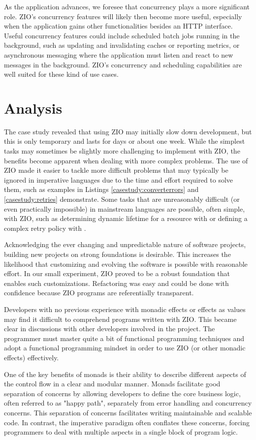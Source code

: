 As the application advances, we foresee that concurrency plays a more significant role. ZIO's concurrency features will likely then become more useful, especially when the application gains other functionalities besides an HTTP interface. Useful concurrency features could include scheduled batch jobs running in the background, such as updating and invalidating caches or reporting metrics, or asynchronous messaging where the application must listen and react to new messages in the background. ZIO's concurrency and scheduling capabilities are well suited for these kind of use cases.


\section{Analysis}
The case study revealed that using ZIO may initially slow down development, but this is only temporary and lasts for days or about one week. While the simplest tasks may sometimes be slightly more challenging to implement with ZIO, the benefits become apparent when dealing with more complex problems. The use of ZIO made it easier to tackle more difficult problems that may typically be ignored in imperative languages due to the time and effort required to solve them, such as examples in Listings \ref{casestudy:converterrors} and \ref{casestudy:retries} demonstrate. Some tasks that are unreasonably difficult (or even practically impossible) in mainstream languages are possible, often simple, with ZIO, such as determining dynamic lifetime for a resource with  or defining a complex retry policy with .

Acknowledging the ever changing and unpredictable nature of software projects, building new projects on strong foundations is desirable. This increases the likelihood that customizing and evolving the software is possible with reasonable effort. In our small experiment, ZIO proved to be a robust foundation that enables such customizations. Refactoring was easy and could be done with confidence because ZIO programs are referentially transparent.

Developers with no previous experience with monadic effects or effects as values may find it difficult to comprehend programs written with ZIO. This became clear in discussions with other developers involved in the project. The programmer must master quite a bit of functional programming techniques and adopt a functional programming mindset in order to use ZIO (or other monadic effects) effectively.

One of the key benefits of monads is their ability to describe different aspects of the control flow in a clear and modular manner. Monads facilitate good separation of concerns by allowing developers to define the core business logic, often referred to as "happy path", separately from error handling and concurrency concerns. This separation of concerns facilitates writing maintainable and scalable code. In contrast, the imperative paradigm often conflates these concerns, forcing programmers to deal with multiple aspects in a single block of program logic.
